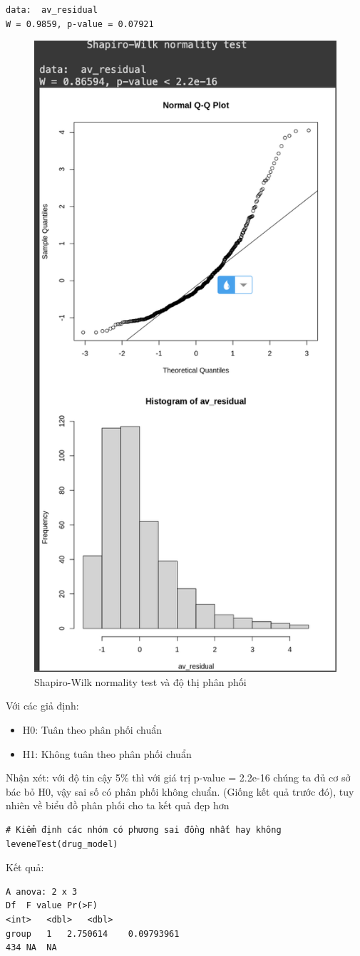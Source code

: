 \begin{itemize}
\begin{lstlisting}
data:  av_residual
W = 0.9859, p-value = 0.07921
    \end{lstlisting}
\begin{figure}
    \centering
    \includegraphics[width=0.5\linewidth]{part23_figures/30.png}
    \caption{Shapiro-Wilk normality test và độ thị phân phối}
    \label{fig:Shapiro-Wilk normality test và đồ thị phân phối}
\end{figure}

    Với các giả định:
    \begin{itemize}
        \item H0: Tuân theo phân phối chuẩn
        \item H1: Không tuân theo phân phối chuẩn
    \end{itemize}
    Nhận xét: với độ tin cậy 5\% thì với giá trị p-value = 2.2e-16 chúng ta đủ cơ sở bác bỏ H0, vậy sai số có phân phối không chuẩn. (Giống kết quả trước đó), tuy nhiên về biểu đồ phân phối cho ta kết quả đẹp hơn

    \begin{lstlisting}
# Kiểm định các nhóm có phương sai đồng nhất hay không
leveneTest(drug_model)
    \end{lstlisting}
    Kết quả:
    \begin{lstlisting}
A anova: 2 x 3
Df	F value	Pr(>F)
<int>	<dbl>	<dbl>
group	1	2.750614	0.09793961
434	NA	NA


\end{lstlisting}
\end{itemize}
